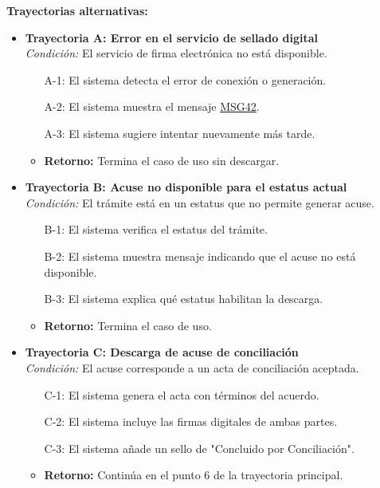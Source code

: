 \begin{appendices}
\textbf{Trayectorias alternativas:}
\begin{itemize}[leftmargin=*]
    \item \textbf{Trayectoria A: Error en el servicio de sellado digital} \\
    \textit{Condición:} El servicio de firma electrónica no está disponible.
    \begin{itemize}[nosep]
        \item[A-1:] El sistema detecta el error de conexión o generación.
        \item[A-2:] El sistema muestra el mensaje \hyperlink{msg:MSG42}{MSG42}.
        \item[A-3:] El sistema sugiere intentar nuevamente más tarde.
        \item \textbf{Retorno:} Termina el caso de uso sin descargar.
    \end{itemize}
    \item \textbf{Trayectoria B: Acuse no disponible para el estatus actual} \\
    \textit{Condición:} El trámite está en un estatus que no permite generar acuse.
    \begin{itemize}[nosep]
        \item[B-1:] El sistema verifica el estatus del trámite.
        \item[B-2:] El sistema muestra mensaje indicando que el acuse no está disponible.
        \item[B-3:] El sistema explica qué estatus habilitan la descarga.
        \item \textbf{Retorno:} Termina el caso de uso.
    \end{itemize}
    \item \textbf{Trayectoria C: Descarga de acuse de conciliación} \\
    \textit{Condición:} El acuse corresponde a un acta de conciliación aceptada.
    \begin{itemize}[nosep]
        \item[C-1:] El sistema genera el acta con términos del acuerdo.
        \item[C-2:] El sistema incluye las firmas digitales de ambas partes.
        \item[C-3:] El sistema añade un sello de "Concluido por Conciliación".
        \item \textbf{Retorno:} Continúa en el punto 6 de la trayectoria principal.
    \end{itemize}
\end{itemize}


\end{appendices}
